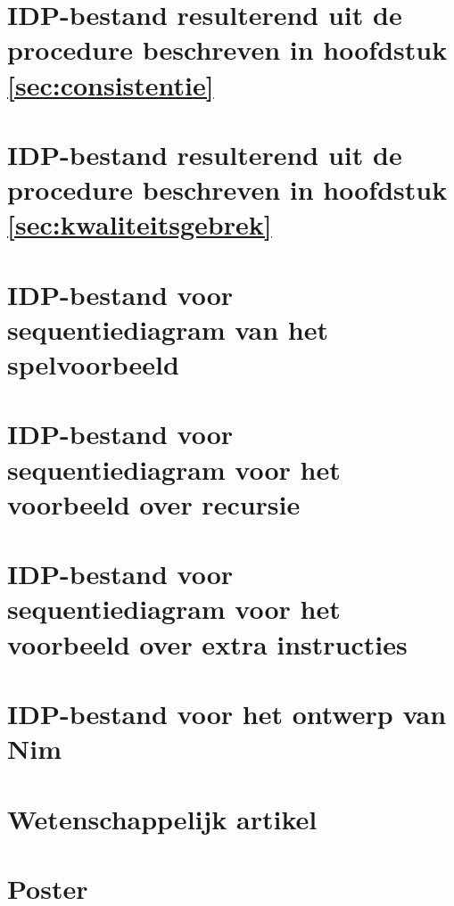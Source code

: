 \chapter{IDP-bestand resulterend uit de procedure beschreven in hoofdstuk \ref{sec:consistentie}}\label{app:consistentie}

\label{code:consistentie}

\chapter{IDP-bestand resulterend uit de procedure beschreven in hoofdstuk \ref{sec:kwaliteitsgebrek}}\label{app:kwaliteitsgebrek}

\label{code:kwaliteitsgebrek}

\chapter{IDP-bestand voor sequentiediagram van het spelvoorbeeld}\label{app:seq-diagram-game}

\label{code:seq-diagram-game}

\chapter{IDP-bestand voor sequentiediagram voor het voorbeeld over recursie}\label{app:seq-recursion}

\label{code:seq-recursion}

\chapter{IDP-bestand voor sequentiediagram voor het voorbeeld over extra instructies}\label{app:new-nim}

\label{code:new-nim}

\chapter{IDP-bestand voor het ontwerp van Nim}

\label{code:nim-eval}

\chapter{Wetenschappelijk artikel}



\chapter{Poster}

